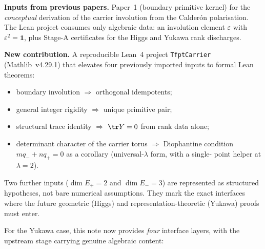 \begin{tfptfrontbox}
\textbf{Inputs from previous papers.} Paper~1 (boundary primitive
kernel) for the \emph{conceptual} derivation of the carrier
involution from the Calder\'on polarisation. The Lean project
consumes only algebraic data: an involution element $\varepsilon$ with
$\varepsilon^2=\mathbf 1$, plus Stage-A certificates for the Higgs and
Yukawa rank discharges.

\textbf{New contribution.} A reproducible Lean~4 project
\texttt{TfptCarrier} (Mathlib~v4.29.1) that elevates four
previously imported inputs to formal Lean theorems:

\begin{itemize}[leftmargin=1.5em, itemsep=0pt]
    \item boundary involution $\Rightarrow$ orthogonal idempotents;
    \item general integer rigidity $\Rightarrow$ unique primitive pair;
    \item structural trace identity $\Rightarrow$ $\tr Y=0$ from
          rank data alone;
    \item determinant character of the carrier torus
          $\Rightarrow$ Diophantine condition $m q_- + n q_+ = 0$
          as a corollary (universal-$\lambda$ form, with a single-
          point helper at $\lambda=2$).
\end{itemize}

Two further inputs ($\dim E_+=2$ and $\dim E_-=3$) are represented
as structured hypotheses, not bare numerical assumptions. They
mark the exact interfaces where the future geometric (Higgs) and
representation-theoretic (Yukawa) proofs must enter.

For the Yukawa case, this note now provides \emph{four}
interface layers, with the upstream stage carrying genuine
algebraic content:


\end{tfptfrontbox}

